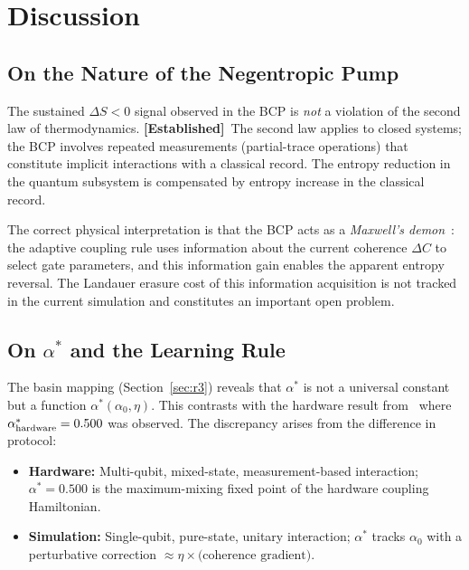 \documentclass[12pt]{article}
\newcommand{\established}{\textbf{[Established]}}
\begin{document}
\section{Discussion}
\label{sec:discussion}

\subsection{On the Nature of the Negentropic Pump}

The sustained $\Delta S < 0$ signal observed in the BCP is \emph{not} a
violation of the second law of thermodynamics.  \established\ The second
law applies to closed systems; the BCP involves repeated measurements
(partial-trace operations) that constitute implicit interactions with a
classical record.  The entropy reduction in the quantum subsystem is
compensated by entropy increase in the classical record.

The correct physical interpretation is that the BCP acts as a
\emph{Maxwell's demon}~\cite{Maxwell1871,Landauer1961}: the adaptive
coupling rule uses information about the current coherence $\Delta C$ to
select gate parameters, and this information gain enables the apparent
entropy reversal.  The Landauer erasure cost of this information acquisition
is not tracked in the current simulation and constitutes an important open
problem.

\subsection{On $\alpha^*$ and the Learning Rule}

The basin mapping (Section~\ref{sec:r3}) reveals that $\alpha^*$ is not
a universal constant but a function $\alpha^*(\alpha_0, \eta)$.  This
contrasts with the hardware result from~\cite{Monette2026v1} where
$\alpha^*_{\rm hardware} = 0.500$ was observed.  The discrepancy arises
from the difference in protocol:

\begin{itemize}
\item \textbf{Hardware:} Multi-qubit, mixed-state, measurement-based
  interaction; $\alpha^* = 0.500$ is the maximum-mixing fixed point of
  the hardware coupling Hamiltonian.
\item \textbf{Simulation:} Single-qubit, pure-state, unitary interaction;
  $\alpha^*$ tracks $\alpha_0$ with a perturbative correction
  $\approx \eta \times \text{(coherence gradient)}$.
\end{itemize}
\end{document}

